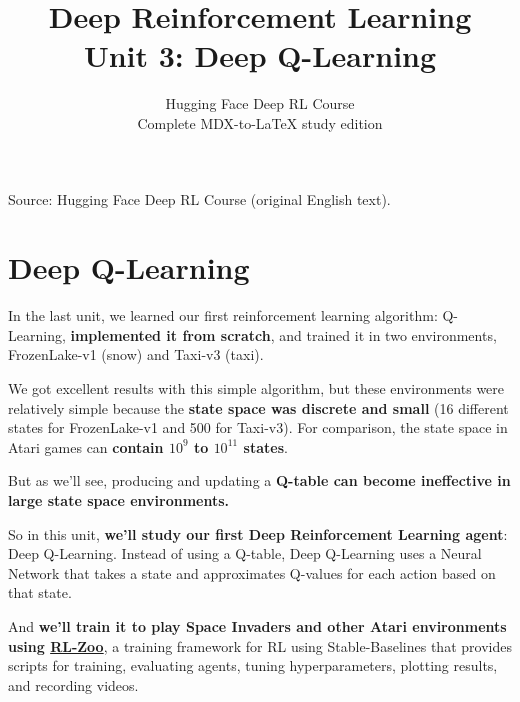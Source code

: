 \documentclass[11pt,a4paper]{article}
\title{\textbf{Deep Reinforcement Learning}\\[0.35em]\large Unit 3: Deep Q-Learning}
\author{Hugging Face Deep RL Course\\\small Complete MDX-to-\LaTeX{} study edition}
\date{}
\begin{document}
\maketitle
\vspace{-0.8em}
\begin{center}\small\color{secondary}Source: Hugging Face Deep RL Course (original English text).\end{center}
\tableofcontents
\vspace{1em}
\clearpage

\section{Deep Q-Learning}\label{deep-q-learning}


In the last unit, we learned our first reinforcement learning algorithm: Q-Learning, \textbf{implemented it from scratch}, and trained it in two environments, FrozenLake-v1 (snow) and Taxi-v3 (taxi).

We got excellent results with this simple algorithm, but these environments were relatively simple because the \textbf{state space was discrete and small} (16 different states for FrozenLake-v1 and 500 for Taxi-v3). For comparison, the state space in Atari games can \textbf{contain \(10^{9}\) to \(10^{11}\) states}.

But as we'll see, producing and updating a \textbf{Q-table can become ineffective in large state space environments.}

So in this unit, \textbf{we'll study our first Deep Reinforcement Learning agent}: Deep Q-Learning. Instead of using a Q-table, Deep Q-Learning uses a Neural Network that takes a state and approximates Q-values for each action based on that state.

And \textbf{we'll train it to play Space Invaders and other Atari environments using \href{https://github.com/DLR-RM/rl-baselines3-zoo}{RL-Zoo}}, a training framework for RL using Stable-Baselines that provides scripts for training, evaluating agents, tuning hyperparameters, plotting results, and recording videos.

\end{document}

